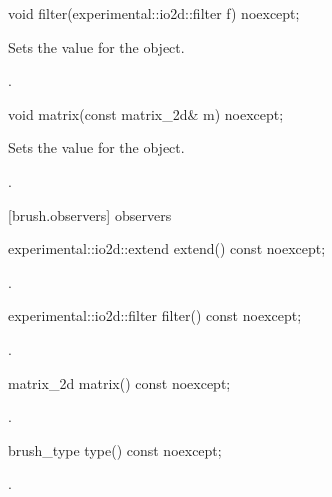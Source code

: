 \begin{itemdecl}
void filter(experimental::io2d::filter f) noexcept;
\end{itemdecl}
\begin{itemdescr}
\pnum
\effects
Sets the  value for the  object.

\pnum
\postconditions
{}.
\end{itemdescr}

\begin{itemdecl}
void matrix(const matrix_2d& m) noexcept;
\end{itemdecl}
\begin{itemdescr}
\pnum
\effects
Sets the  value for the  object.

\pnum
\postconditions
{}.
\end{itemdescr}

 [brush.observers]{ observers}

\begin{itemdecl}
experimental::io2d::extend extend() const noexcept;
\end{itemdecl}
\begin{itemdescr}
\pnum
\returns
{}.
\end{itemdescr}

\begin{itemdecl}
experimental::io2d::filter filter() const noexcept;
\end{itemdecl}
\begin{itemdescr}
\pnum
\returns
{}.
\end{itemdescr}

\begin{itemdecl}
matrix_2d matrix() const noexcept;
\end{itemdecl}
\begin{itemdescr}
\pnum
\returns
{}.
\end{itemdescr}

\begin{itemdecl}
brush_type type() const noexcept;
\end{itemdecl}
\begin{itemdescr}
\pnum
\returns
{}.
\end{itemdescr}
